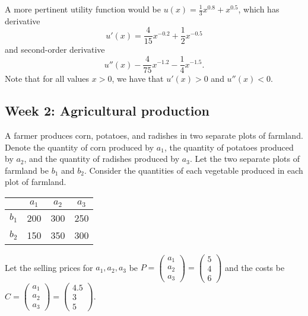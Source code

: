 \documentclass[a4paper, 12pt,oneside,openany]{book}
\begin{document}
A more pertinent utility function would be $u(x) = \frac{1}{3}x^{0.8}+x^{0.5}$, which has derivative $$u'(x) = \frac{4}{15}x^{-0.2}+\frac{1}{2}x^{-0.5}$$ and second-order derivative $$u''(x)-\frac{4}{75}x^{-1.2}-\frac{1}{4}x^{-1.5}.$$ Note that for all values $x>0$, we have that $u'(x)>0$ and $u''(x)<0$. 

\subsection{Week 2: Agricultural production} 

A farmer produces corn, potatoes, and radishes in two separate plots of farmland. Denote the quantity of corn produced by $a_1$, the quantity of potatoes produced by $a_2$, and the quantity of radishes produced by $a_3$. Let the two separate plots of farmland be $b_1$ and $b_2$. Consider the quantities of each vegetable produced in each plot of farmland.

\begin{center}
    \begin{tabular}{|l|ccc|} 
        \hline
        & $a_1$ & $a_2$ & $a_3$ \\
        \hline
        $b_1$& 200 & 300 & 250 \\
        $b_2$& 150 & 350 & 300  \\

        \hline
    \end{tabular} 
\end{center}

Let the selling prices for $a_1, a_2, a_3$ be $P=\begin{pmatrix} a_1\\a_2\\a_3 \end{pmatrix} = \begin{pmatrix} 5\\4\\ 6\end{pmatrix}$ and the costs be $C=\begin{pmatrix} a_1\\a_2\\a_3 \end{pmatrix} = \begin{pmatrix} 4.5\\3\\ 5\end{pmatrix}$.
\end{document}
